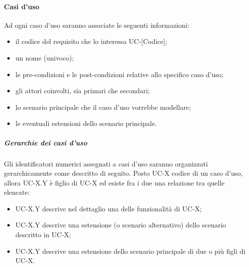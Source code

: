 \documentclass[11pt,a4paper]{article}
\begin{document}
{	\paragraph{Casi d'uso\\}
	Ad ogni caso d'uso saranno associate le seguenti informazioni:
	\begin{itemize}
		\item il codice del requisito che lo interessa UC-[Codice];
		\item un nome (univoco);
		\item le pre-condizioni e le post-condizioni relative allo specifico caso d'uso;
		\item gli attori coinvolti, sia primari che secondari;
		\item lo scenario principale che il caso d'uso vorrebbe modellare;
		\item le eventuali estensioni dello scenario principale.
	\end{itemize}
	\subparagraph{Gerarchie dei casi d'uso} 
	Gli identificatori numerici assegnati a casi d'uso saranno organizzati gerarchicamente come descritto di seguito. Posto UC-X codice di un caso d'uso, allora UC-X.Y è figlio di UC-X ed esiste fra i due una relazione tra quelle elencate:
	\begin{itemize}
		\item UC-X.Y descrive nel dettaglio una delle funzionalità di UC-X;
		\item UC-X.Y descrive una estensione (o scenario alternativo) dello scenario descritto in UC-X; 
		\item UC-X.Y descrive una estensione dello scenario principale di due o più figli di UC-X.
	\end{itemize}
}
\end{document}
